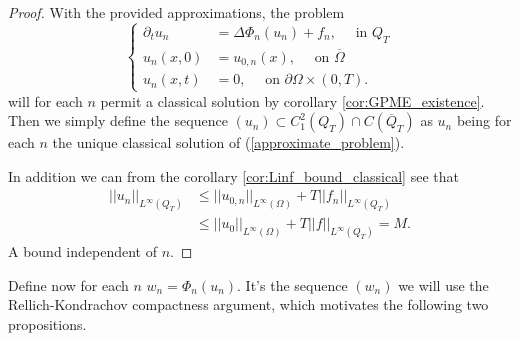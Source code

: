 \documentclass[11pt, a4paper]{article}
\begin{document}
\begin{proof}
With the provided approximations, the problem
\begin{equation}
	\label{approximate_problem}
	\begin{cases}
	\partial_t u_n &= \Delta\Phi_n(u_n) + f_n, \quad \text{ in } Q_T \\
	u_n(x,0) &= u_{0,n}(x),	\quad \text{ on } \overline{\Omega} \\
	u_n(x,t) &= 0, \quad \text{ on }  \partial \Omega \times (0,T).
	\end{cases}
\end{equation}
will for each $n$ permit a classical solution by corollary \ref{cor:GPME_existence}. Then we simply define the sequence $(u_n) \subset C^2_1(Q_T)\cap C(\overline{Q}_T)$ as $u_n$ being for each $n$ the unique classical solution of (\ref{approximate_problem}).

In addition we can from the corollary   \ref{cor:Linf_bound_classical} see that
	\begin{align*}
	||u_n||_{L^\infty(Q_T)} &\leq ||u_{0,n}||_{L^\infty(\Omega)} + T||f_n||_{L^\infty(Q_T)} \\
	&\leq ||u_0||_{L^\infty(\Omega)} + T||f||_{L^\infty(Q_T)} = M.
	\end{align*}
	A bound independent of $n$.  	
\end{proof}

Define now for each $n$ $w_n = \Phi_n(u_n)$. It's the sequence $(w_n)$ we will use the Rellich-Kondrachov compactness argument, which motivates the following two propositions.
\end{document}
